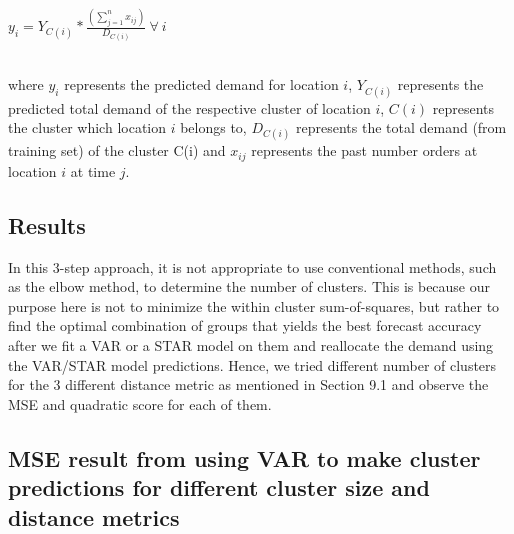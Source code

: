 \documentclass[nonblindrev,msom]{informs3} %
\begin{document}
\begin{center}
    $\displaystyle y_{i} = Y_{C(i)} * \frac{(\sum_{j=1}^{n}x_{ij})}{D_{C(i)}} \: \forall \: i$
\end{center}

\noindent  \\

\noindent where $y_i$ represents the predicted demand for location $i$, $Y_{C(i)}$ represents the predicted total demand of the respective cluster of location $i$, $C(i)$ represents the cluster which location $i$ belongs to, $D_{C(i)}$ represents the total demand (from training set) of the cluster C(i) and $x_{ij}$ represents the past number orders at location $i$ at time $j$. 


\subsection{Results}

In this 3-step approach, it is not appropriate to use conventional methods, such as the elbow method, to determine the number of clusters. This is because our purpose here is not to minimize the within cluster sum-of-squares, but rather to find the optimal combination of groups that yields the best forecast accuracy after we fit a VAR or a STAR model on them and reallocate the demand using the VAR/STAR model predictions. Hence, we tried different number of clusters for the 3 different distance metric as mentioned in Section 9.1 and observe the MSE and quadratic score for each of them.

\newpage
\subsection{MSE result from using VAR to make cluster predictions for different cluster size and distance metrics}
\end{document}
